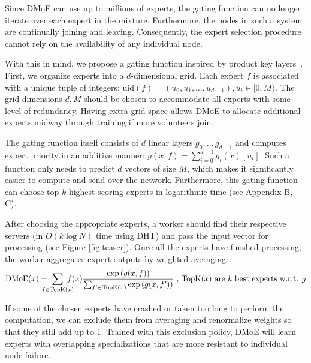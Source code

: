 Since DMoE can use up to millions of experts, the gating function can no longer iterate over each expert in the mixture. Furthermore, the nodes in such a system are continually joining and leaving. Consequently, the expert selection procedure cannot rely on the availability of any individual node.

\vspace{-1px}

With this in mind, we propose a gating function inspired by product key layers~\cite{pkm}. First, we organize experts into a $d$-dimensional grid. Each expert $f$ is associated with a unique tuple of integers: $\textrm{uid}(f) = (u_0, u_1, \ldots, u_{d-1}), u_i \in [0, M)$. The grid dimensions $d, M$ should be chosen to accommodate all experts with some level of redundancy. Having extra grid space allows DMoE to allocate additional experts midway through training if more volunteers join. %

\vspace{-1px}

The gating function itself consists of $d$ linear layers $g_0,\dots\,g_{d-1}$ and computes expert priority in an additive manner: $g(x, f) = \sum_{i=0}^{d - 1} g_i(x)[u_i]$. Such a function only needs to predict $d$ vectors of size $M$, which makes it significantly easier to compute and send over the network. Furthermore, this gating function can choose top-$k$ highest-scoring experts in logarithmic time (see Appendix B, C).

\vspace{-4px}

After choosing the appropriate experts, a worker should find their respective servers (in $O(k \log N)$ time using DHT) and pass the input vector for processing (see Figure \ref{fig:teaser}). Once all the experts have finished processing, the worker aggregates expert outputs by weighted averaging:
\begin{equation}
\label{eq:dmoe_averaging}
    \textrm{DMoE}(x) = \!\!\!\!\!\! \sum_{f \in \mathrm{TopK}(x)} \!\!\!\!\!\! f(x) \frac{\exp\left({g(x, f)}\right)}{\sum_{f' \in \mathrm{TopK}(x)} \exp\left({g(x, f')}\right)}
    \space\text{ , $\mathrm{TopK}(x)$ are $k$ best experts w.r.t. $g$}
\end{equation}
\vspace{-8px}

If some of the chosen experts have crashed or taken too long to perform the computation, we can exclude them from averaging and renormalize weights so that they still add up to 1. Trained with this exclusion policy, DMoE will learn experts with overlapping specializations that are more resistant to individual node failure.
\vspace{-4px}
